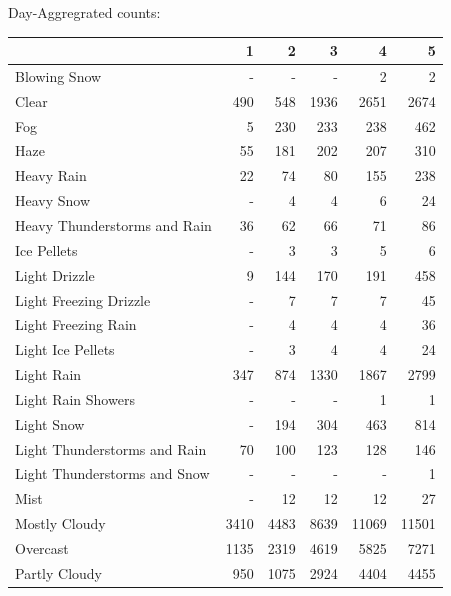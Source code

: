 \documentclass[11pt]{scrartcl}
\begin{document}

Day-Aggregrated counts:
\begin{tabular}{lrrrrr}
\toprule
{} &     1 &     2 &     3 &      4 &      5 \\
\midrule
Blowing Snow                  &   - &   - &   - &      2 &      2 \\
Clear                         &   490 &   548 &  1936 &   2651 &   2674 \\
Fog                           &     5 &   230 &   233 &    238 &    462 \\
Haze                          &    55 &   181 &   202 &    207 &    310 \\
Heavy Rain                    &    22 &    74 &    80 &    155 &    238 \\
Heavy Snow                    &   - &     4 &     4 &      6 &     24 \\
Heavy Thunderstorms and Rain  &    36 &    62 &    66 &     71 &     86 \\
Ice Pellets                   &   - &     3 &     3 &      5 &      6 \\
Light Drizzle                 &     9 &   144 &   170 &    191 &    458 \\
Light Freezing Drizzle        &   - &     7 &     7 &      7 &     45 \\
Light Freezing Rain           &   - &     4 &     4 &      4 &     36 \\
Light Ice Pellets             &   - &     3 &     4 &      4 &     24 \\
Light Rain                    &   347 &   874 &  1330 &   1867 &   2799 \\
Light Rain Showers            &   - &   - &   - &      1 &      1 \\
Light Snow                    &   - &   194 &   304 &    463 &    814 \\
Light Thunderstorms and Rain  &    70 &   100 &   123 &    128 &    146 \\
Light Thunderstorms and Snow  &   - &   - &   - &    - &      1 \\
Mist                          &   - &    12 &    12 &     12 &     27 \\
Mostly Cloudy                 &  3410 &  4483 &  8639 &  11069 &  11501 \\
Overcast                      &  1135 &  2319 &  4619 &   5825 &   7271 \\
Partly Cloudy                 &   950 &  1075 &  2924 &   4404 &   4455 \\

\end{tabular}
\end{document}
